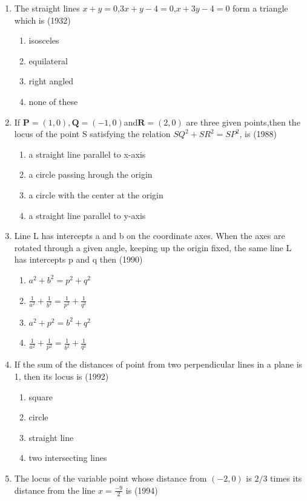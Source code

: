 \documentclass[12pt]{article}
\let\vec\mathbf
\begin{document}
\begin{enumerate}
\item The straight lines $x+y=0$,$3x+y-4=0$,$x+3y-4=0$ form a triangle which is (1932)
\begin{enumerate}
\item isosceles
\item equilateral
\item right angled
\item none of these
\end{enumerate}
\item If $\vec{P}=(1,0),\vec{Q}=(-1,0) $and$ \vec{R}=(2,0)$ are three given points,then the locus of the point S satisfying the relation $SQ^2+SR^2=SP^2$, is (1988)
\begin{enumerate}
\item a straight line parallel to x-axis  
\item a circle passing hrough the origin 
\item a circle with the center at the origin 
\item a straight line parallel to y-axis
\end{enumerate}
\item Line L has intercepts a and b on the coordinate axes. When the axes are rotated through a given angle, keeping up the origin fixed, the same line L has intercepts  p and q then (1990)\\
\begin{enumerate}
\item $a^2+b^2=p^2+q^2$ 
\item $\frac{1}{a^2} +\frac{1}{b^2}=\frac{1}{p^2}+\frac{1}{q^2}$ 
\item $a^2+p^2=b^2+q^2$ 
\item $\frac{1}{a^2}+\frac{1}{p^2}=\frac{1}{b^2}+\frac{1}{q^2}$
\end{enumerate}
\item If the sum of the distances of point from two perpendicular lines in a plane is 1, then its locus is (1992)\\
\begin{enumerate}
\item square 
\item circle 
\item straight line  
\item two intersecting lines
\end{enumerate}
\item The locus of the variable point whose distance from $(-2,0)$ is $2/3$ times its distance from the line $x= \frac{-9}{2}$ is (1994)
\begin{enumerate}

\end{enumerate}
\end{enumerate}
\end{document}
